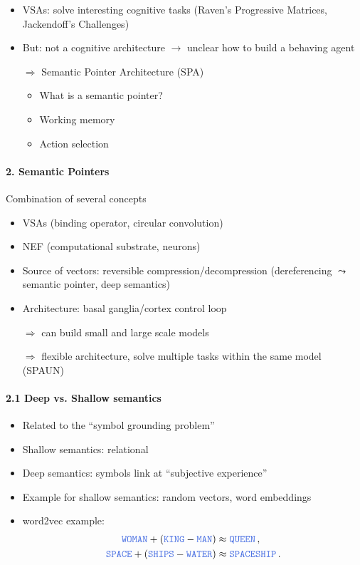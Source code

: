 \documentclass[10pt,letterpaper]{article}
\begin{document}
\begin{itemize}
	\item VSAs: solve interesting cognitive tasks (Raven's Progressive Matrices, Jackendoff's Challenges)
	\item But: not a cognitive architecture $\rightarrow$ unclear how to build a behaving agent
	\item[$\Rightarrow$] Semantic Pointer Architecture (SPA)
	\begin{itemize}
		\item What is a semantic pointer?
		\item Working memory
		\item Action selection
	\end{itemize}
\end{itemize}

\paragraph{2. Semantic Pointers}

Combination of several concepts
\begin{itemize}
	\item VSAs (binding operator, circular convolution)
	\item NEF (computational substrate, neurons)
	\item Source of vectors: reversible compression/decompression (dereferencing $\leadsto$ semantic pointer, deep semantics)
	\item Architecture: basal ganglia/cortex control loop
	\item[$\Rightarrow$] can build small and large scale models
	\item[$\Rightarrow$] flexible architecture, solve multiple tasks within the same model (SPAUN)
\end{itemize}

\paragraph{2.1 Deep vs. Shallow semantics}
\begin{itemize}
	\item Related to the \enquote{symbol grounding problem}
	\item Shallow semantics: relational
	\item Deep semantics: symbols link at \enquote{subjective experience}
	\item Example for shallow semantics: random vectors, word embeddings
	\item word2vec example:
		\begin{align*}
		\Obj{WOMAN} + (\Obj{KING} - \Obj{MAN}) &\approx \Obj{QUEEN} \,,\\
		\Obj{SPACE} + (\Obj{SHIPS} - \Obj{WATER}) &\approx \Obj{SPACESHIP} \,.
		\end{align*}
\end{itemize}
\end{document}
